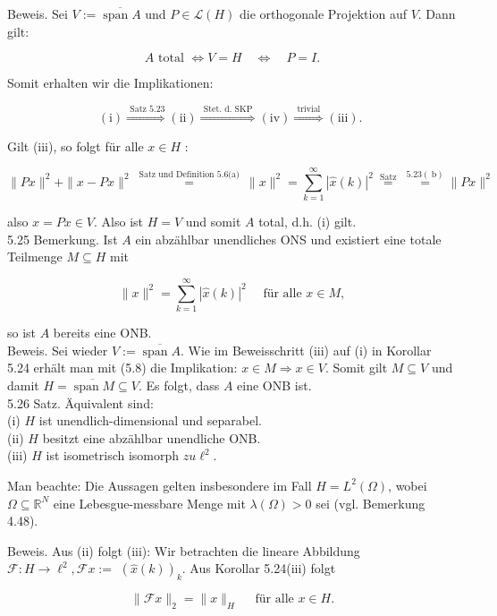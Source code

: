 \documentclass[10pt, letterpaper]{article}
\begin{document}
Beweis. Sei $V:=\overline{\operatorname{span} A}$ und $P \in \mathcal{L}(H)$ die orthogonale Projektion auf $V$. Dann gilt:

$$
A \text { total } \Longleftrightarrow V=H \quad \Longleftrightarrow \quad P=I .
$$

Somit erhalten wir die Implikationen:

$$
(\mathrm{i}) \stackrel{\text { Satz } 5.23}{\Longrightarrow}(\mathrm{ii}) \stackrel{\text { Stet. d. SKP }}{\Longrightarrow}(\mathrm{iv}) \stackrel{\text { trivial }}{\Longrightarrow}(\mathrm{iii}) \text {. }
$$

Gilt (iii), so folgt für alle $x \in H$ :

$$
\|P x\|^{2}+\|x-P x\|^{2} \stackrel{\text { Satz und Definition 5.6(a) }}{=}\|x\|^{2}=\sum_{k=1}^{\infty}|\hat{x}(k)|^{2} \stackrel{\text { Satz }}{=} \stackrel{5.23(\mathrm{~b})}{=}\|P x\|^{2}
$$

also $x=P x \in V$. Also ist $H=V$ und somit $A$ total, d.h. (i) gilt.\\
5.25 Bemerkung. Ist $A$ ein abzählbar unendliches ONS und existiert eine totale Teilmenge $M \subseteq H$ mit

$$
\|x\|^{2}=\sum_{k=1}^{\infty}|\hat{x}(k)|^{2} \quad \text { für alle } x \in M,
$$

so ist $A$ bereits eine ONB.\\
Beweis. Sei wieder $V:=\overline{\operatorname{span} A}$. Wie im Beweisschritt (iii) auf (i) in Korollar 5.24 erhält man mit (5.8) die Implikation: $x \in M \Longrightarrow x \in V$. Somit gilt $M \subseteq V$ und damit $H=\overline{\operatorname{span} M} \subseteq V$. Es folgt, dass $A$ eine ONB ist.\\
5.26 Satz. Äquivalent sind:\\
(i) $H$ ist unendlich-dimensional und separabel.\\
(ii) $H$ besitzt eine abzählbar unendliche ONB.\\
(iii) $H$ ist isometrisch isomorph $z u \ell^{2}$.

Man beachte: Die Aussagen gelten insbesondere im Fall $H=L^{2}(\Omega)$, wobei $\Omega \subseteq \mathbb{R}^{N}$ eine Lebesgue-messbare Menge mit $\lambda(\Omega)>0$ sei (vgl. Bemerkung 4.48).

Beweis. Aus (ii) folgt (iii): Wir betrachten die lineare Abbildung $\mathcal{F}: H \rightarrow \ell^{2}, \mathcal{F} x:=$ $(\hat{x}(k))_{k}$. Aus Korollar 5.24(iii) folgt

$$
\|\mathcal{F} x\|_{2}=\|x\|_{H} \quad \text { für alle } x \in H .
$$
\end{document}

